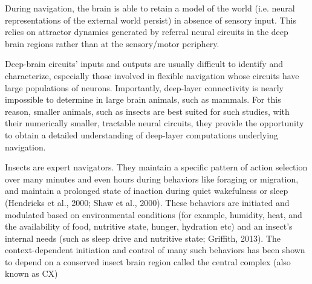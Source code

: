     
    During navigation, the brain is able to retain a model of the world (i.e. neural representations of the external world persist) in absence of sensory input. This relies on attractor dynamics generated by referral neural circuits in the deep brain regions rather than at the sensory/motor periphery. 
    
    Deep-brain circuits' inputs and outputs are usually difficult to identify and characterize, especially those involved in flexible navigation whose circuits have large populations of neurons. Importantly, deep-layer connectivity is nearly impossible to determine in large brain animals, such as mammals. 
    For this reason, smaller animals, such as insects are best suited for such studies, with their numerically smaller, tractable neural circuits, they provide the opportunity to obtain a detailed understanding of deep-layer computations underlying navigation. 

    Insects are expert navigators. They maintain a specific pattern of action selection over many minutes and even hours during behaviors like foraging or migration, and maintain a prolonged state of inaction during quiet wakefulness or sleep (Hendricks et al., 2000; Shaw et al., 2000). These behaviors are initiated and modulated based on environmental conditions (for example, humidity, heat, and the availability of food, nutritive state, hunger, hydration etc) and an insect’s internal needs (such as sleep drive and nutritive state; Griffith, 2013). The context-dependent initiation and control of many such behaviors has been shown to depend on a conserved insect brain region called the central complex (also known as CX) %


